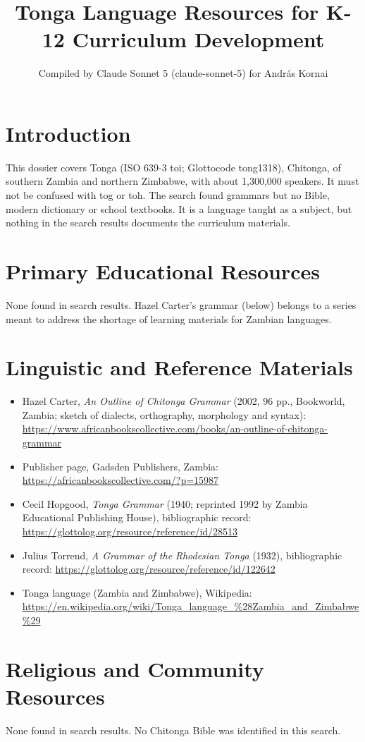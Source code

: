 \documentclass[12pt]{article}
\title{Tonga Language Resources for K-12 Curriculum Development}
\author{Compiled by Claude Sonnet 5 (claude-sonnet-5) for Andr\'as Kornai}
\date{}
\begin{document}
\maketitle

\section{Introduction}
This dossier covers Tonga (ISO 639-3 toi; Glottocode tong1318), Chitonga, of southern Zambia and northern Zimbabwe, with about 1,300,000 speakers. It must not be confused with tog or toh. The search found grammars but no Bible, modern dictionary or school textbooks. It is a language taught as a subject, but nothing in the search results documents the curriculum materials.

\section{Primary Educational Resources}
None found in search results. Hazel Carter's grammar (below) belongs to a series meant to address the shortage of learning materials for Zambian languages.

\section{Linguistic and Reference Materials}
\begin{itemize}
\item Hazel Carter, \emph{An Outline of Chitonga Grammar} (2002, 96 pp., Bookworld, Zambia; sketch of dialects, orthography, morphology and syntax): \url{https://www.africanbookscollective.com/books/an-outline-of-chitonga-grammar}
\item Publisher page, Gadsden Publishers, Zambia: \url{https://africanbookscollective.com/?p=15987}
\item Cecil Hopgood, \emph{Tonga Grammar} (1940; reprinted 1992 by Zambia Educational Publishing House), bibliographic record: \url{https://glottolog.org/resource/reference/id/28513}
\item Julius Torrend, \emph{A Grammar of the Rhodesian Tonga} (1932), bibliographic record: \url{https://glottolog.org/resource/reference/id/122642}
\item Tonga language (Zambia and Zimbabwe), Wikipedia: \url{https://en.wikipedia.org/wiki/Tonga_language_%28Zambia_and_Zimbabwe%29}
\end{itemize}

\section{Religious and Community Resources}
None found in search results. No Chitonga Bible was identified in this search.
\end{document}
